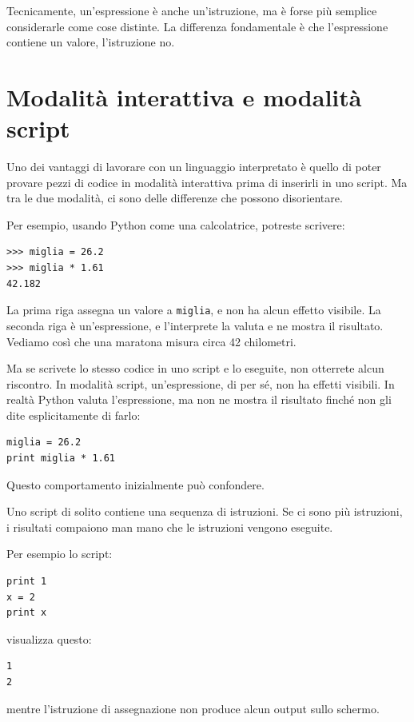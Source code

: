 \documentclass[10pt]{book}
\begin{document}
Tecnicamente, un'espressione è anche un'istruzione, ma è forse più semplice considerarle come cose distinte. La differenza fondamentale è che l'espressione contiene un valore, l'istruzione no.


\section{Modalità interattiva e modalità script}

Uno dei vantaggi di lavorare con un linguaggio interpretato è quello di poter provare pezzi di codice in modalità interattiva prima di inserirli in uno script. Ma tra le due modalità, ci sono delle differenze che possono disorientare.

Per esempio, usando Python come una calcolatrice, potreste scrivere:

\begin{verbatim}
>>> miglia = 26.2
>>> miglia * 1.61
42.182
\end{verbatim}

La prima riga assegna un valore a {\tt miglia}, e non ha alcun effetto visibile. La seconda riga è un'espressione, e l'interprete la valuta e ne mostra il risultato. Vediamo così che una maratona misura circa 42 chilometri.

Ma se scrivete lo stesso codice in uno script e lo eseguite, non otterrete alcun riscontro. In modalità script, un'espressione, di per sé, non ha effetti visibili. In realtà Python valuta l'espressione, ma non ne mostra il risultato finché non gli dite esplicitamente di farlo:

\begin{verbatim}
miglia = 26.2
print miglia * 1.61
\end{verbatim}

Questo comportamento inizialmente può confondere.

Uno script di solito contiene una sequenza di istruzioni. Se ci sono più istruzioni, i risultati compaiono man mano che le istruzioni vengono eseguite.

Per esempio lo script:

\begin{verbatim}
print 1
x = 2
print x
\end{verbatim}
%
visualizza questo:

\begin{verbatim}
1
2
\end{verbatim}
%
mentre l'istruzione di assegnazione non produce alcun output sullo schermo.
\end{document}
